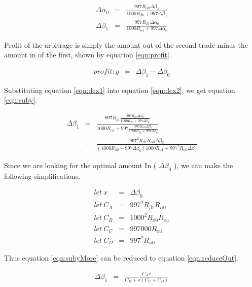 \documentclass[runningheads]{llncs}
\begin{document}
\begin{eqnarray}
	\Delta\alpha_{0}  &=& \frac{997 R_{\alpha 0} \Delta\beta_{0} }{1000 R_{\beta 0} + 997 \Delta\beta_{0}} \label{eqn:dex1}\\
	\Delta\beta_{1}  &=& \frac{997 R_{\beta 1} \Delta\alpha_{0} }{1000 R_{\alpha 1} + 997 \Delta\alpha_{0}} \label{eqn:dex2}
\end{eqnarray}

Profit of the arbitrage is simply the amount out of the second trade minus the amount in of the first, shown by equation \ref{eqn:profit}.

\begin{eqnarray}
	profit: y  &=& \Delta\beta_{1} - \Delta\beta_{0} \label{eqn:profit}
\end{eqnarray}


Substituting equation \ref{eqn:dex1} into equation \ref{eqn:dex2}, we get equation \ref{eqn:suby}.

\begin{eqnarray}
	\Delta\beta_{1}  &=& \frac{997 R_{\beta 1} \frac{997 R_{\alpha 0} \Delta\beta_{0} }{1000 R_{\beta 0} + 997 \Delta\beta_{0}} }{1000 R_{\alpha 1} + 997 \frac{997 R_{\alpha 0} \Delta\beta_{0} }{1000 R_{\beta 0} + 997 \Delta\beta_{0}}} \label{eqn:suby}\\
	&=& \frac{997^2 R_{\beta 1}  R_{\alpha 0} \Delta\beta_{0} }{(1000 R_{\beta 0} + 997 \Delta\beta_{0}) 1000 R_{\alpha 1} + 997^2 R_{\alpha 0} \Delta\beta_{0} } \label{eqn:subyMore}
\end{eqnarray}

Since we are looking for the optimal amount In ( \(\Delta\beta_{0}\) ), we can make the following simplifications.

\begin{eqnarray}
	let \: x &=& \Delta\beta_{0}\\
	let \: C_{A} &=& 997^2 R_{\beta 1}  R_{\alpha 0}\\
	let \: C_{B} &=& 1000^2 R_{\beta 0} R_{\alpha 1}\\
	let \: C_{C} &=& 997000  R_{\alpha 1}\\
	let \: C_{D} &=& 997^2  R_{\alpha 0}
\end{eqnarray}

Thus equation \ref{eqn:subyMore} can be reduced to equation \ref{eqn:reduceOut}.

\begin{eqnarray}
	\Delta\beta_{1}  &=& \frac{C_{A} x}{C_{B} + x(C_{C} + C_{D})} \label{eqn:reduceOut}
\end{eqnarray}
\end{document}
